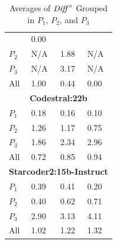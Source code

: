 \begin{table}
\begin{tabularx}{\textwidth}{l X X X}
& 0.00\\
$P_2$ 
& N/A 
& 1.88
& N/A\\
$P_3$ 
& N/A
& 3.17 
& N/A\\
All 
& 1.00 
& 0.44
& 0.00\\
\midrule
\multicolumn{4}{c}{\small\textbf{Codestral:22b}} \\
\midrule
$P_1$ 
& 0.18 
& 0.16
& 0.10\\
$P_2$ 
& 1.26
& 1.17
& 0.75\\
$P_3$ 
& 1.86
& 2.34
& 2.96\\
All 
& 0.72 
& 0.85
& 0.94\\
\midrule
\multicolumn{4}{c}{\small\textbf{Starcoder2:15b-Instruct}} \\
\midrule
$P_1$ 
& 0.39
& 0.41
& 0.20\\
$P_2$ 
& 0.40 
& 0.62
& 0.71\\
$P_3$ 
& 2.90
& 3.13 
& 4.11\\
All 
& 1.02 
& 1.22
& 1.32\\
\bottomrule
\end{tabularx}
\caption{Averages of ${\mathit{Diff}}^\diamond$ Grouped in $P_1$, $P_2$, and $P_3$}
\label{tab:fgi_diff}
\end{table}


